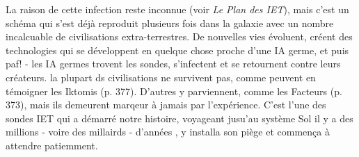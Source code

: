 La raison de cette infection reste inconnue (voir \textit{Le Plan des IET}), mais c'est un schéma qui s'est déjà reproduit plusieurs fois dans la galaxie avec un nombre incalcuable de civilisations extra-terrestres. De nouvelles vies évoluent, créent des technologies qui se développent en quelque chose proche d'une IA germe, et puis paf! - les IA germes trovent les sondes, s'infectent et se retournent contre leurs créateurs. la plupart ds civilisations ne survivent pas, comme peuvent en témoigner les Iktomis (p. 377). D'autres y parviennent, comme les Facteurs (p. 373), mais ils demeurent marqeur à jamais par l'expérience. C'est l'une des sondes IET qui a démarré notre histoire, voyageant jusu'au système Sol il y a des millions - voire des millairds - d'années , y installa son piège et commença à attendre patiemment. 



